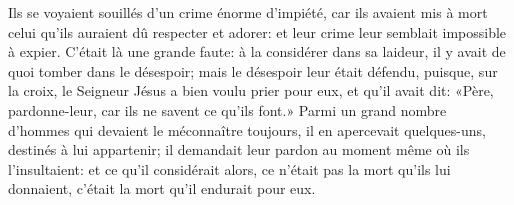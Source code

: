 Ils se voyaient souillés d’un crime énorme d’impiété,
	car ils avaient mis à mort celui qu’ils auraient dû respecter et adorer:
	et leur crime leur semblait impossible à expier.
C’était là une grande faute:
	à la considérer dans sa laideur, il y avait de quoi tomber dans le désespoir;
	mais le désespoir leur était défendu,
	puisque, sur la croix, le Seigneur Jésus a bien voulu prier pour eux,
	et qu’il avait dit:	«Père, pardonne-leur, car ils ne savent ce qu’ils font.»
Parmi un grand nombre d’hommes qui devaient le méconnaître toujours,
	il en apercevait quelques-uns, destinés à lui appartenir;
	il demandait leur pardon au moment même où ils l’insultaient:
	et ce qu’il considérait alors, ce n’était pas la mort qu’ils lui donnaient,
	c’était la mort qu’il endurait pour eux.
